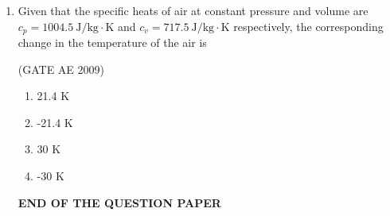 \documentclass[journal,12pt,onecolumn]{IEEEtran}
\theoremstyle{remark}
\begin{document}
\begin{flushleft}
\begin{enumerate}
\item Given that the specific heats of air at constant pressure and volume are \(c_p = 1004.5\ \mathrm{J/kg{\cdot}K}\) and \(c_v = 717.5\ \mathrm{J/kg{\cdot}K}\) respectively, the corresponding change in the temperature of the air is

\hfill(GATE AE 2009)

\begin{enumerate}
\item 21.4 K
\item -21.4 K
\item 30 K
\item -30 K
\end{enumerate}



\begin{center}
    \textbf{END OF THE QUESTION PAPER}
\end{center}

\end{enumerate}
\end{flushleft}
\end{document}

